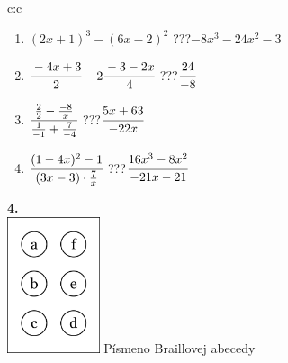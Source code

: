 \documentclass[10pt]{report}
\begin{document}
\begin{tabular}{c:c}
\begin{minipage}[c][104.5mm][t]{0.5\linewidth}
\begin{center}
\begin{minipage}{0.79\linewidth}
\begin{center}
\begin{varwidth}{\linewidth}
\begin{enumerate}
\item $(2x+1)^3-(6x-2)^2$\quad \dotfill\; ???\;\dotfill \quad $-8x^3-24x^2-3$
\item $\cfrac{-4x+3}{2}-2\cfrac{-3-2x}{4}$\quad \dotfill\; ???\;\dotfill \quad $\cfrac{24}{-8}$
\item $\cfrac{\frac{2}{2}-\frac{-8}{x}}{\frac{1}{-1}+\frac{7}{-4}}$\quad \dotfill\; ???\;\dotfill \quad $\cfrac{5x+63}{-22x}$
\item $\cfrac{(1-4x)^2-1}{(3x-3)\cdot\frac{7}{x}}$\quad \dotfill\; ???\;\dotfill \quad $\cfrac{16x^3-8x^2}{-21x-21}$
\end{enumerate}
\end{varwidth}
\end{center}
\end{minipage}
\begin{minipage}{0.20\linewidth}
\begin{center}
{\Huge\bfseries 4.} \\[2mm]
\includegraphics[height=40mm]{../images/braille.png}
{\small Písmeno Braillovej abecedy}
\end{center}
\end{minipage}
\end{center}
\end{minipage}
%
\end{tabular}
\newpage
\thispagestyle{empty}
\end{document}
